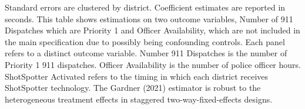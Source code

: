 \begin{table}[H]
\begin{threeparttable}
\begin{tablenotes}
\item Standard errors are clustered by district. Coefficient                      estimates are reported in seconds.                      This table shows estimations on two outcome variables,                       Number of 911 Dispatches which are Priority 1 and Officer Availability, which are not                      included in the main specification due to possibly being                      confounding controls.                      Each panel refers to a distinct outcome variable.                  Number 911 Dispatches is the number of Priority 1 911 dispatches.                  Officer Availability is the number of police officer hours.                  ShotSpotter Activated refers to the                  timing in which each district receives ShotSpotter technology. The                  Gardner (2021) estimator is robust to the heterogeneous                  treatment effects in staggered two-way-fixed-effects designs.
\end{tablenotes}
\end{threeparttable}
\end{table}
